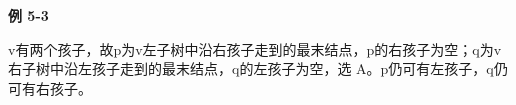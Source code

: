 {\color{ink}\bfseries 例 5-3}\par\vspace{1bp}v有两个孩子，故p为v左子树中沿右孩子走到的最末结点，p的右孩子为空；q为v右子树中沿左孩子走到的最末结点，q的左孩子为空，选 A。p仍可有左孩子，q仍可有右孩子。
